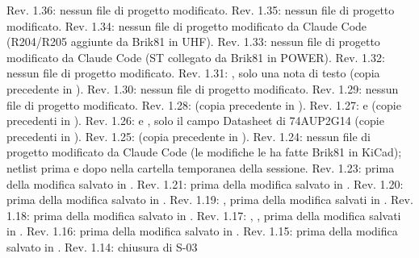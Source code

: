Rev. 1.36: nessun file di progetto modificato. Rev. 1.35: nessun file di progetto modificato. Rev. 1.34: nessun file di progetto modificato da Claude Code (R204/\allowbreak{}R205 aggiunte da Brik81 in UHF). Rev. 1.33: nessun file di progetto modificato da Claude Code (ST collegato da Brik81 in POWER). Rev. 1.32: nessun file di progetto modificato. Rev. 1.31: , solo una nota di testo (copia precedente in ). Rev. 1.30: nessun file di progetto modificato. Rev. 1.29: nessun file di progetto modificato. Rev. 1.28:  (copia precedente in ). Rev. 1.27:  e  (copie precedenti in ). Rev. 1.26:  e , solo il campo Datasheet di 74AUP2G14 (copie precedenti in ). Rev. 1.25:  (copia precedente in ). Rev. 1.24: nessun file di progetto modificato da Claude Code (le modifiche le ha fatte Brik81 in KiCad); netlist prima e dopo nella cartella temporanea della sessione. Rev. 1.23:  prima della modifica salvato in . Rev. 1.21:  prima della modifica salvato in . Rev. 1.20:  prima della modifica salvato in . Rev. 1.19: ,  prima della modifica salvati in . Rev. 1.18:  prima della modifica salvato in . Rev. 1.17: , ,  prima della modifica salvati in . Rev. 1.16:  prima della modifica salvato in . Rev. 1.15:  prima della modifica salvato in . Rev. 1.14: chiusura di S-03

